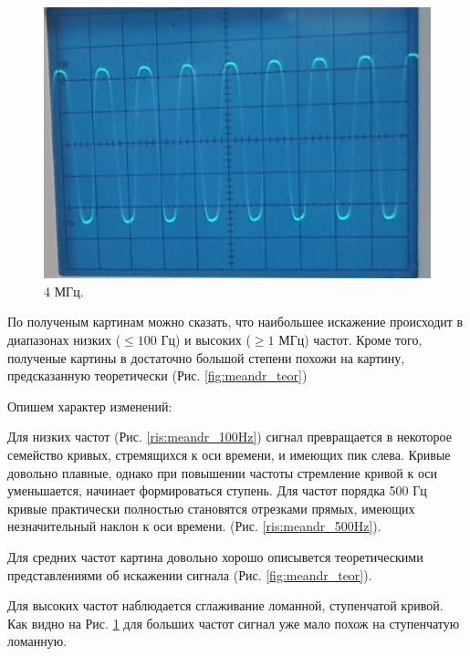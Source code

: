 \documentclass[12pt,a4paper]{article}
\begin{document}
\begin{figure}[h!]
\begin{center}
		\end{center}
		\begin{center}
			\begin{minipage}[lh]{0.32\linewidth}
				\includegraphics[width=1\linewidth]{meandr_4MHz}
				\caption{4 МГц.} %
				\label{ris:meandr_4MHz} %
			\end{minipage}
		\hfill	
		\end{center}
	\end{figure}
	
	По полученым картинам можно сказать, что наибольшее искажение происходит в диапазонах низких ($\leq 100$ Гц) и высоких ($\geq 1$ МГц) частот. Кроме того, полученые картины в достаточно большой степени похожи на картину, предсказанную теоретически (Рис. \ref{fig:meandr_teor})
	
	Опишем характер изменений:
	
	Для низких частот (Рис. \ref{ris:meandr_100Hz}) сигнал превращается в некоторое семейство кривых, стремящихся к оси времени, и имеющих пик слева. Кривые довольно плавные, однако при повышении частоты стремление кривой к оси уменьшается, начинает формироваться ступень. Для частот порядка 500 Гц кривые практически полностью становятся отрезками прямых, имеющих незначительный наклон к оси времени. (Рис. \ref{ris:meandr_500Hz}). 
	
	Для средних частот картина довольно хорошо описывется теоретическими представлениями об искажении сигнала (Рис. \ref{fig:meandr_teor}).
	
	Для высоких частот наблюдается сглаживание ломанной, ступенчатой кривой. Как видно на Рис. \ref{ris:meandr_4MHz} для больших частот сигнал уже мало похож на ступенчатую ломанную.
\end{document}
